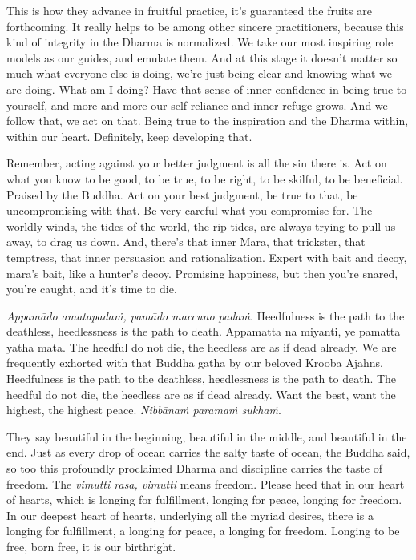 \documentclass[12pt,openany]{book}
\begin{document}
This is how they advance in fruitful practice, it's guaranteed the fruits are forthcoming. It really helps to be among other sincere practitioners, because this kind of integrity in the Dhar\-ma is normalized. We take our most inspiring role models as our guides, and emulate them. And at this stage it doesn't matter so much what everyone else is doing, we're just being clear and knowing what we are doing. What am I doing? Have that sense of inner confidence in being true to yourself, and more and more our self reliance and inner refuge grows. And we follow that, we act on that. Being true to the inspiration and the Dhar\-ma within, within our heart. Definitely, keep developing that.

Remember, acting against your better judgment is all the sin there is. Act on what you know to be good, to be true, to be right, to be skilful, to be beneficial. Praised by the Buddha. Act on your best judgment, be true to that, be uncompromising with that. Be very careful what you compromise for. The worldly winds, the tides of the world, the rip tides, are always trying to pull us away, to drag us down. And, there's that inner Mara, that trickster, that temptress, that inner persuasion and rationalization. Expert with bait and decoy, mara’s bait, like a hunter's decoy. Promising happiness, but then you're snared, you're caught, and it's time to die. 

\textit{Appamādo amatapadaṁ, pamādo maccuno padaṁ}. Heedfulness is the path to the deathless, heedlessness is the path to death. Appamatta na miyanti, ye pamatta yatha mata. The heedful do not die, the heedless are as if dead already. We are frequent\-ly exhorted with that Buddha gatha by our beloved Krooba Ajahns. Heedfulness is the path to the deathless, heedlessness is the path to death. The heedful do not die, the heedless are as if dead already. Want the best, want the highest, the highest peace. \textit{Nibbānaṁ paramaṁ sukhaṁ}.

They say beautiful in the beginning, beautiful in the middle, and beautiful in the end. Just as every drop of ocean carries the salty taste of ocean, the Buddha said, so too this pro\-found\-ly proclaimed Dhar\-ma and discipline carries the taste of freedom. The \textit{vi\-mut\-ti ra\-sa, vi\-mut\-ti} means freedom. Please heed that in our heart of hearts, which is longing for fulfillment, longing for peace, longing for freedom. In our deepest heart of hearts, underlying all the myriad desires, there is a longing for fulfillment, a longing for peace, a longing for freedom. Longing to be free, born free, it is our birthright.
\end{document}
